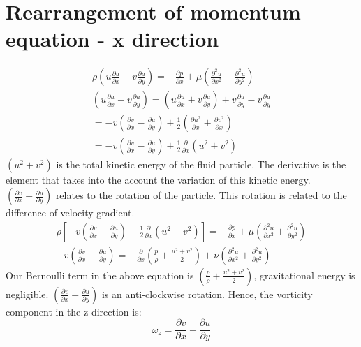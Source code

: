 \documentclass[class=report, crop=false, 12pt,a4paper]{standalone}
\begin{document}
\section{Rearrangement of momentum equation - x direction}
\begin{gather}
  \rho \left( u \frac{\partial u}{\partial x} + v\frac{\partial u}{\partial y} \right) = -\frac{\partial p}{\partial x}  + \mu \left( \frac{\partial^2 u}{\partial x^2} + \frac{\partial^2 u}{\partial y^2} \right)\\
  \left(u \frac{\partial u}{\partial x} + v \frac{\partial u}{\partial y} \right) = \left(u \frac{\partial u}{\partial x} + v \frac{\partial u}{\partial y} \right) + v \frac{\partial u}{\partial y} - v \frac{\partial u}{\partial y}\\
  = - v \left(\frac{\partial v}{\partial x} - \frac{\partial u}{\partial y} \right) + \frac{1}{2} \left( \frac{\partial u^2}{\partial x} + \frac{\partial v^2}{\partial x} \right)\\
  = - v \left( \frac{\partial v}{\partial x} - \frac{\partial u}{\partial y} \right) + \frac{1}{2} \frac{\partial}{\partial x} (u^2 + v^2)
\end{gather}
$(u^2 + v^2)$ is the total kinetic energy of the fluid particle. The derivative is the element that takes into the account the variation of this kinetic energy. $\left( \frac{\partial v}{\partial x} - \frac{\partial u}{\partial y} \right)$ relates to the rotation of the particle. This rotation is related to the difference of velocity gradient.
\begin{gather}
  \rho \left[ -v \left( \frac{\partial v}{\partial x} - \frac{\partial u}{\partial y} \right) + \frac{1}{2} \frac{\partial}{\partial x} (u^2 + v^2) \right] = - \frac{\partial p}{\partial x} + \mu \left( \frac{\partial^2 u}{\partial x^2} + \frac{\partial^2 u}{\partial y^2} \right)\\
  - v \left( \frac{\partial v}{\partial x} - \frac{\partial u}{\partial y} \right) = - \frac{\partial}{\partial x} \left( \frac{p}{\rho} + \frac{u^2 + v^2}{2} \right) + \nu \left( \frac{\partial^2 u}{\partial x^2} + \frac{\partial^2 u}{\partial y^2} \right)   
\end{gather}
Our Bernoulli term in the above equation is $\left( \frac{p}{\rho} + \frac{u^2 + v^2}{2} \right)$, gravitational energy is negligible. $\left( \frac{\partial v}{\partial x} - \frac{\partial u}{\partial y} \right)$ is an anti-clockwise rotation. Hence, the vorticity component in the z direction is:
\begin{equation}
  \omega_z = \frac{\partial v}{\partial x} - \frac{\partial u}{\partial y}
\end{equation}
\end{document}
